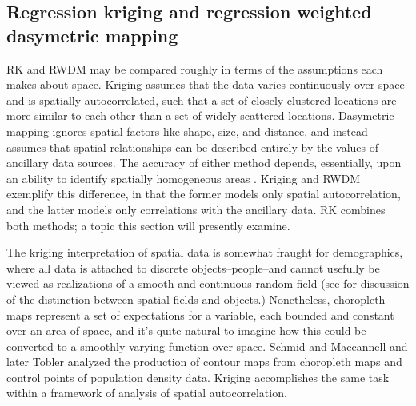 \subsection{Regression kriging and regression weighted dasymetric mapping}

RK and RWDM may be compared roughly in terms of the assumptions each makes about space.  Kriging assumes that the data varies continuously over space and is spatially autocorrelated, such that a set of closely clustered locations are more similar to each other than a set of widely scattered locations.  Dasymetric mapping ignores spatial factors like shape, size, and distance, and instead assumes that spatial relationships can be described entirely by the values of ancillary data sources.  The accuracy of either method depends, essentially, upon an ability to identify spatially homogeneous areas \citep{maantay07, maantay08}.  Kriging and RWDM exemplify this difference, in that the former models only spatial autocorrelation, and the latter models only correlations with the ancillary data.  RK combines both methods; a topic this section will presently examine.

The kriging interpretation of spatial data is somewhat fraught for demographics, where all data is attached to discrete objects--people--and cannot usefully be viewed as realizations of a smooth and continuous random field (see \citep{cova02, kjenstad06} for discussion of the distinction between spatial fields and objects.)  Nonetheless, choropleth maps represent a set of expectations for a variable, each bounded and constant over an area of space, and it's quite natural to imagine how this could be converted to a smoothly varying function over space.  Schmid and Maccannell\cite{schmid55} and later Tobler \cite{tobler79} analyzed the production of contour maps from choropleth maps and control points of population density data.  Kriging accomplishes the same task within a framework of analysis of spatial autocorrelation.

